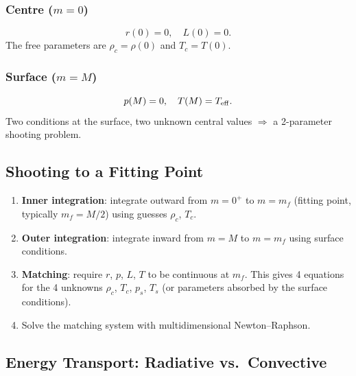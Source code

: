 \subsubsection*{Centre ($m=0$)}
\begin{equation}
  r(0)=0,\quad L(0)=0.
  \label{eq:lec14:bc_centre}
\end{equation}
The free parameters are $\rho_c = \rho(0)$ and $T_c = T(0)$.

\subsubsection*{Surface ($m=M$)}
\begin{equation}
  p(M)=0,\quad T(M) = T_{\rm eff}.
  \label{eq:lec14:bc_surface}
\end{equation}
Two conditions at the surface, two unknown central values
$\Rightarrow$ a 2-parameter shooting problem.

\subsection{Shooting to a Fitting Point}\label{subsec:lec14:fitting}

\begin{enumerate}
  \item \textbf{Inner integration}: integrate outward from $m=0^+$
        to $m=m_f$ (fitting point, typically $m_f=M/2$) using
        guesses $\rho_c$, $T_c$.
  \item \textbf{Outer integration}: integrate inward from $m=M$
        to $m=m_f$ using surface conditions.
  \item \textbf{Matching}: require $r$, $p$, $L$, $T$ to be
        continuous at $m_f$.  This gives 4 equations for the
        4 unknowns $\rho_c$, $T_c$, $p_s$, $T_s$ (or parameters
        absorbed by the surface conditions).
  \item Solve the matching system with multidimensional Newton–Raphson.
\end{enumerate}


\subsection{Energy Transport: Radiative vs.\ Convective}\label{subsec:lec14:transport}

